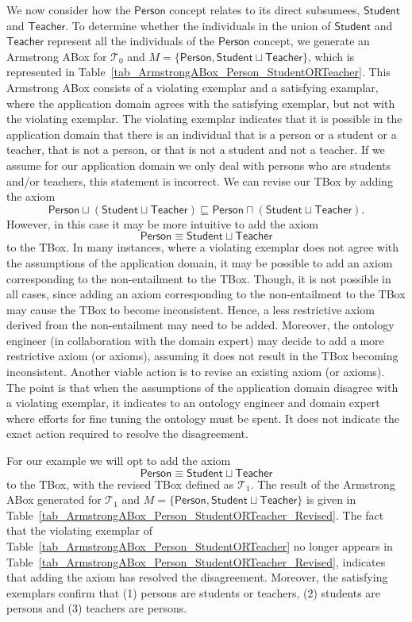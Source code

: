 \documentclass{amsart}
\begin{document}
We now consider how the $\mathsf{Person}$ concept relates to its direct subsumees, $\mathsf{Student} $ and $\mathsf{Teacher}$. To determine whether the individuals in the union of $\mathsf{Student}$ and $\mathsf{Teacher}$ represent all the individuals of the $\mathsf{Person}$ concept, we generate an Armstrong ABox for $\mathcal{T}_0$ and  $M = \{\mathsf{Person}, \mathsf{Student} \sqcup \mathsf{Teacher}\}$, which is represented in Table~\ref{tab_ArmstrongABox_Person_StudentORTeacher}. This Armstrong ABox consists of a violating exemplar and a satisfying examplar, where the application domain agrees with the satisfying exemplar, but not with the violating exemplar. The violating exemplar indicates that it is possible in the application domain that there is an individual that is a person or a student or a teacher, that is not a person, or that is not a student and not a teacher. If we assume for our application domain we only deal with persons who are students and/or teachers, this statement is incorrect. We can revise our TBox by adding the axiom 
\[\mathsf{Person} \sqcup (\mathsf{Student} \sqcup \mathsf{Teacher}) \sqsubseteq \mathsf{Person} \sqcap (\mathsf{Student} \sqcup \mathsf{Teacher}).\]
However, in this case it may be more intuitive to add the axiom
     \[\mathsf{Person} \equiv \mathsf{Student} \sqcup \mathsf{Teacher}\]
to the TBox. In many instances, where a violating exemplar does not agree with the assumptions of the application domain, it may be possible to add an axiom corresponding to the non-entailment to the TBox. Though, it is not possible in all cases, since adding an axiom corresponding to the non-entailment to the TBox may cause the TBox to become inconsistent. Hence, a less restrictive axiom derived from the non-entailment may need to be added. Moreover, the ontology engineer (in collaboration with the domain expert) may decide to add a more restrictive axiom (or axioms), assuming it does not result in the TBox becoming inconsistent. Another viable action is to revise an existing axiom (or axioms). The point is that when the assumptions of the application domain disagree with a violating exemplar, it indicates to an ontology engineer and domain expert where efforts for fine tuning the ontology must be spent. It does not indicate the exact action required to resolve the disagreement.

For our example we will opt to add the axiom
 \[\mathsf{Person} \equiv \mathsf{Student} \sqcup \mathsf{Teacher}\]
to the TBox, with the revised TBox defined  as $\mathcal{T}_1$.
The result of the Armstrong ABox generated for $\mathcal{T}_1$ and $M=\{\mathsf{Person}, \mathsf{Student} \sqcup \mathsf{Teacher}\}$ is given in Table~\ref{tab_ArmstrongABox_Person_StudentORTeacher_Revised}. The fact that the violating exemplar of Table~\ref{tab_ArmstrongABox_Person_StudentORTeacher} no longer appears in Table~\ref{tab_ArmstrongABox_Person_StudentORTeacher_Revised}, indicates that adding the axiom has resolved the disagreement. Moreover, the satisfying exemplars confirm that (1) persons are students or teachers, (2) students are persons and (3) teachers are persons.
\end{document}
